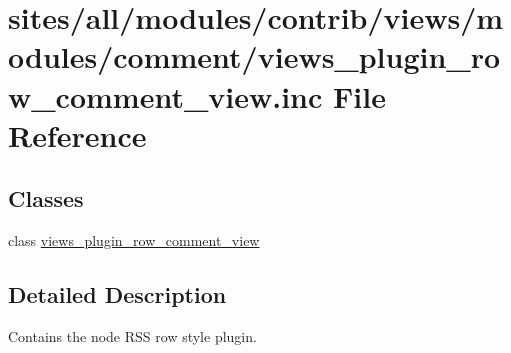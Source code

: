\hypertarget{views__plugin__row__comment__view_8inc}{
\section{sites/all/modules/contrib/views/modules/comment/views\_\-plugin\_\-row\_\-comment\_\-view.inc File Reference}
\label{views__plugin__row__comment__view_8inc}
}
\subsection*{Classes}
\begin{CompactItemize}
\item 
class \hyperlink{classviews__plugin__row__comment__view}{views\_\-plugin\_\-row\_\-comment\_\-view}
\end{CompactItemize}


\subsection{Detailed Description}
Contains the node RSS row style plugin. 